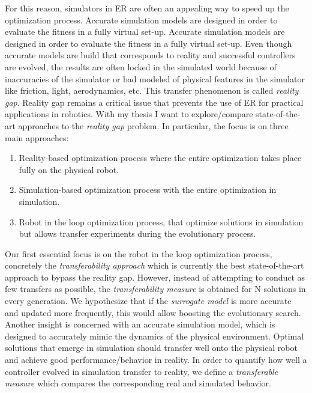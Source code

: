 For this reason, simulators in ER are often an appealing way to speed up the optimization process. Accurate simulation models are designed in order to evaluate the fitness in a fully virtual set-up. Accurate simulation models are designed in order to evaluate the fitness in a fully virtual set-up. Even though accurate models are build that corresponds to reality and successful controllers are evolved, the results are often locked in the simulated world because of inaccuracies of the simulator or bad modeled of physical features in the simulator like friction, light, aerodynamics, etc. This transfer phenomenon is called \textit{reality gap}. Reality gap remains a critical issue that prevents the use of ER for practical applications in robotics. With my thesis I want to explore/compare state-of-the-art approaches to the \textit{reality gap} problem. In particular, the focus is on three main approaches:

\begin{enumerate}
    \item Reality-based optimization process where the entire optimization takes place fully on the physical robot.
    \item Simulation-based optimization process with the entire optimization in simulation.
    \item Robot in the loop optimization process, that optimize solutions in simulation but allows transfer experiments during the evolutionary process.
\end{enumerate}

Our first essential focus is on the robot in the loop optimization process, concretely the \textit{transferability approach} \citep{koos2012transferability} which is currently the best state-of-the-art approach to bypass the reality gap. However, instead of attempting to conduct as few transfers as possible, the \textit{transferability measure} is obtained for N solutions in every generation. We hypothesize that if the \textit{surrogate model} is more accurate and updated more frequently, this would allow boosting the evolutionary search. Another insight is concerned with an accurate simulation model, which is designed to accurately mimic the dynamics of the physical environment. Optimal solutions that emerge in simulation should transfer well onto the physical robot and achieve good performance/behavior in reality. In order to quantify how well a controller evolved in simulation transfer to reality, we define a \textit{transferable measure} which compares the corresponding real and simulated behavior.

